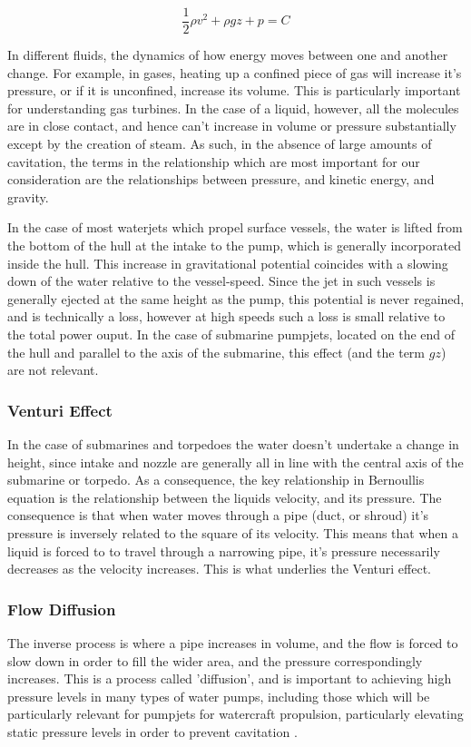 \documentclass{article}\usepackage[]{graphicx}\usepackage[]{color}
\begin{document}
\begin{equation}
\label{eq:bernoullis}
\frac{1}{2}\rho v^2 + \rho gz + p = C
\end{equation}

In different fluids, the dynamics of how energy moves between one and another change.  For example, in gases, heating up a confined piece of gas will increase it's pressure, or if it is unconfined, increase its volume. This is particularly important for understanding gas turbines. In the case of a liquid, however, all the molecules are in close contact, and hence can't increase in volume or pressure substantially except by the creation of steam. As such, in the absence of large amounts of cavitation, the terms in the relationship which are most important for our consideration are the relationships between pressure, and kinetic energy, and gravity.

In the case of most waterjets which propel surface vessels, the water is lifted from the bottom of the hull at the intake to the pump, which is generally incorporated inside the hull. This increase in gravitational potential coincides with a slowing down of the water relative to the vessel-speed. Since the jet in such vessels is generally ejected at the same height as the pump, this potential is never regained, and is technically a loss, however at high speeds such a loss is small relative to the total power ouput.  In the case of submarine pumpjets, located on the end of the hull and parallel to the axis of the submarine, this effect (and the term $gz$) are not relevant.

\subsubsection{Venturi Effect}
In the case of submarines and torpedoes the water doesn't undertake a change in height, since intake and nozzle are generally all in line with the central axis of the submarine or torpedo.  As a consequence, the key relationship in Bernoullis equation is the relationship between the liquids velocity, and its pressure.  The consequence is that when water moves through a pipe (duct, or shroud) it's pressure is inversely related to the square of its velocity.  This means that when a liquid is forced to to travel through a narrowing pipe, it's pressure necessarily decreases as the velocity increases.  This is what underlies the Venturi effect.

\subsubsection{Flow Diffusion}
The inverse process is where a pipe increases in volume, and the flow is forced to slow down in order to fill the wider area, and the pressure correspondingly increases.  This is a process called 'diffusion', and is important to achieving high pressure levels in many types of water pumps, including those which will be particularly relevant for pumpjets for watercraft propulsion, particularly elevating static pressure levels in order to prevent cavitation \parencite{hamilton1997, mccormick1963design, bruce1974}.
\end{document}

